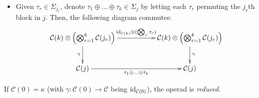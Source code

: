 \documentclass{article}
\begin{document}
\begin{defn}
\begin{itemize}
\begin{itemize}
        Then, the following diagram commutes:
        \[\xymatrix{
            \mathcal{C}(k)\tensor \left(\bigtensor_{r=1}^k \mathcal{C}(j_r)\right) \ar[d]_-{\gamma} \ar[rr]^-{\sigma\tensor \sigma^{-1}} && \mathcal{C}(k)\tensor \left(\bigtensor_{r=1}^k \mathcal{C}(j_{\sigma(r)})\right) \ar[d]^-{\gamma}\\
            \mathcal{C}(j) \ar[rr]_-{\sigma(j_{\sigma(1)},...,j_{\sigma(k)})} && \mathcal{C}(j)
        }\]
        \item Given $\tau_r\in \Sigma_{j_r}$, denote $\tau_1\oplus ... \oplus \tau_k\in \Sigma_j$ by letting each $\tau_r$ permuting the $j_r$th block in $j$. 
        Then, the following diagram commutes:
        \[\xymatrix{
            \mathcal{C}(k)\tensor \left(\bigtensor_{r=1}^k \mathcal{C}(j_r)\right)\ar[d]_-{\gamma} \ar[rr]^-{\id_{\mathcal{C}(k)}\tensor (\bigtensor_r \tau_r)} && \mathcal{C}(k)\tensor \left(\bigtensor_{r=1}^k \mathcal{C}(j_r)\right) \ar[d]^-{\gamma}\\
            \mathcal{C}(j) \ar[rr]_{\tau_1\oplus...\oplus\tau_k} && \mathcal{C}(j)
        }\]
    \end{itemize}
\end{itemize}

If $\mathcal{C}(0)=\kappa$ (with $\gamma:\mathcal{C}(0)\rightarrow \mathcal{C}$ being $\mathrm{id}_{\mathcal{C}(0)}$), the operad is \emph{reduced}.
\end{defn}

\end{document}

